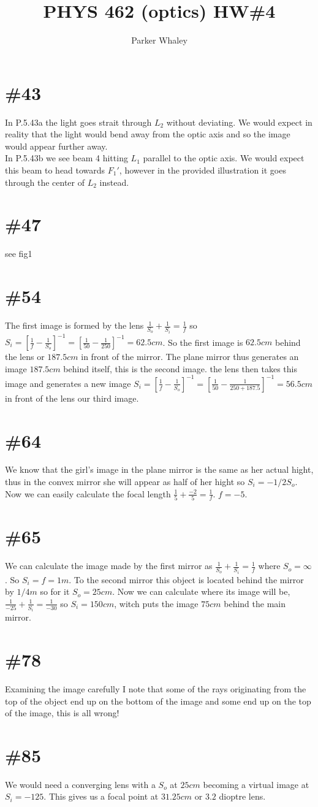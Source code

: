 \documentclass[12pt,a4paper]{article}
\author{Parker Whaley}
\title{PHYS 462 (optics) HW\#4}
\begin{document}
\maketitle
\section{\#43}
In P.5.43a the light goes strait through $L_2$ without deviating.  We would expect in reality that the light would bend away from the optic axis and so the image would appear further away.\\

In P.5.43b we see beam 4 hitting $L_1$ parallel to the optic axis.  We would expect this beam to head towards $F_1'$, however in the provided illustration it goes through the center of $L_2$ instead.
\section{\#47}
see fig1
\section{\#54}
The first image is formed by the lens $\frac{1}{S_o}+\frac{1}{S_i}=\frac{1}{f}$ so $S_i=[\frac{1}{f}-\frac{1}{S_o}]^{-1}=[\frac{1}{50}-\frac{1}{250}]^{-1}=62.5cm$.  So the first image is $62.5cm$ behind the lens or $187.5cm$ in front of the mirror.  The plane mirror thus generates an image $187.5cm$ behind itself, this is the second image.  the lens then takes this image and generates a new image $S_i=[\frac{1}{f}-\frac{1}{S_o}]^{-1}=[\frac{1}{50}-\frac{1}{250+187.5}]^{-1}=56.5cm$ in front of the lens our third image.
\section{\#64}
We know that the girl's image in the plane mirror is the same as her actual hight, thus in the convex mirror she will appear as half of her hight so $S_i=-1/2S_o$.  Now we can easily calculate the focal length $\frac{1}{5}+\frac{-2}{5}=\frac{1}{f}$.  $f=-5$.
\section{\#65}
We can calculate the image made by the first mirror as $\frac{1}{S_o}+\frac{1}{S_i}=\frac{1}{f}$ where $S_o=\infty$.  So $S_i=f=1m$.  To the second mirror this object is located behind the mirror by $1/4m$ so for it $S_o=25cm$.  Now we can calculate where its image will be, $\frac{1}{-25}+\frac{1}{S_i}=\frac{1}{-30}$ so $S_i=150cm$, witch puts the image $75cm$ behind the main mirror.
\section{\#78}
Examining the image carefully I note that some of the rays originating from the top of the object end up on the bottom of the image and some end up on the top of the image, this is all wrong!
\section{\#85}
We would need a converging lens with a $S_o$ at $25cm$ becoming a virtual image at $S_i=-125$.  This gives us a focal point at $31.25cm$ or $3.2$ dioptre lens.
\end{document}
